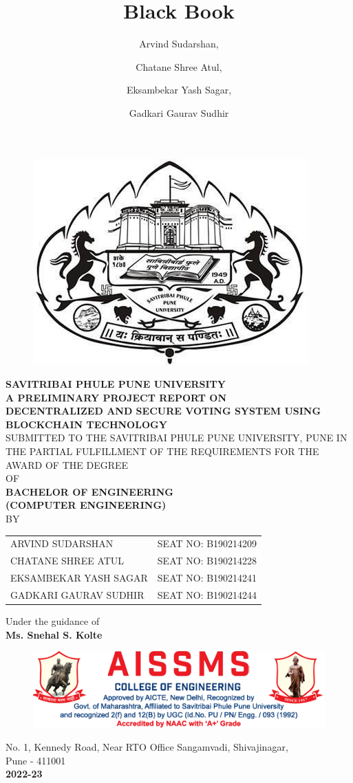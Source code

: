 \documentclass[oneside, 12pt]{book}
\title{Black Book}
\author{
  Arvind Sudarshan,
  \and
  Chatane Shree Atul,
  \and
  Eksambekar Yash Sagar,
  \and
  Gadkari Gaurav Sudhir
}
\begin{document}
\pagestyle{plain}
\renewcommand{\headrulewidth}{0pt}
\titleformat{\chapter}[display]{\bfseries\centering}{\chaptertitlename}{20pt}{\Large\uppercase}

\frontmatter

\begin{titlepage}
	\centering
	\begin{figure}[H]
		\centering
		\includegraphics[width=0.4\linewidth]{./Resources/sppu.png}
	\end{figure}
	\textbf{SAVITRIBAI PHULE PUNE UNIVERSITY}\break
	\\\textbf{A PRELIMINARY PROJECT REPORT ON}\break
	\\{\large\textbf{DECENTRALIZED AND SECURE VOTING SYSTEM USING BLOCKCHAIN TECHNOLOGY}}\break
	\\SUBMITTED TO THE SAVITRIBAI PHULE PUNE UNIVERSITY, PUNE IN THE PARTIAL FULFILLMENT OF THE REQUIREMENTS FOR THE AWARD OF THE DEGREE\break
	\\OF\break
	\\{\large\textbf{BACHELOR OF ENGINEERING\\(COMPUTER ENGINEERING)}}\break
	\\BY\break
	\begin{table}[H]
		\centering
		\begin{tabular}{lr}
			ARVIND SUDARSHAN      & SEAT NO: B190214209 \\
			CHATANE SHREE ATUL    & SEAT NO: B190214228 \\
			EKSAMBEKAR YASH SAGAR & SEAT NO: B190214241 \\
			GADKARI GAURAV SUDHIR & SEAT NO: B190214244
		\end{tabular}
	\end{table}
	Under the guidance of\break
	\\\textbf{Ms. Snehal S. Kolte}\break
	\begin{figure}[H]
		\centering
		\includegraphics[width=\linewidth]{./Resources/letterhead2.png}
	\end{figure}
	No. 1, Kennedy Road, Near RTO Office Sangamvadi, Shivajinagar,\\Pune - 411001
	\\\textbf{\large 2022-23}
	\restoregeometry
\end{titlepage}
\end{document}
